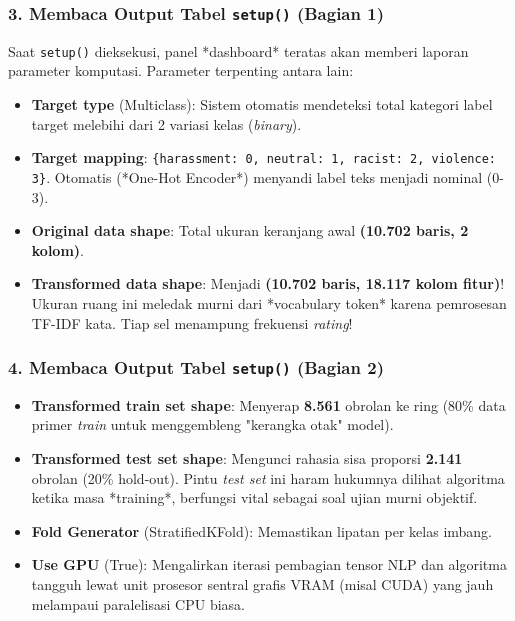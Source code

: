 \documentclass[t,aspectratio=169,xcolor=dvipsnames]{beamer}
\begin{document}
\begin{frame}
    \frametitle{3. Membaca Output Tabel \texttt{setup()} (Bagian 1)}
    \small
    Saat \texttt{setup()} dieksekusi, panel *dashboard* teratas akan memberi laporan parameter komputasi. Parameter terpenting antara lain:
    \vspace{0.2cm}
    \begin{itemize}
        \item \textbf{Target type} (Multiclass): Sistem otomatis mendeteksi total kategori label target melebihi dari 2 variasi kelas (\textit{binary}).
        \item \textbf{Target mapping}: \texttt{\{harassment: 0, neutral: 1, racist: 2, violence: 3\}}. Otomatis (*One-Hot Encoder*) menyandi label teks menjadi nominal (0-3).
        \item \textbf{Original data shape}: Total ukuran keranjang awal \textbf{(10.702 baris, 2 kolom)}.
        \item \textbf{Transformed data shape}: Menjadi \textbf{(10.702 baris, 18.117 kolom fitur)}! Ukuran ruang ini meledak murni dari *vocabulary token* karena pemrosesan TF-IDF kata. Tiap sel menampung frekuensi \textit{rating}!
    \end{itemize}
\end{frame}

\begin{frame}
    \frametitle{4. Membaca Output Tabel \texttt{setup()} (Bagian 2)}
    \small
    \begin{itemize}
        \item \textbf{Transformed train set shape}: Menyerap \textbf{8.561} obrolan ke ring (80\% data primer \textit{train} untuk menggembleng "kerangka otak" model).
        \item \textbf{Transformed test set shape}: Mengunci rahasia sisa proporsi \textbf{2.141} obrolan (20\% hold-out). Pintu \textit{test set} ini haram hukumnya dilihat algoritma ketika masa *training*, berfungsi vital sebagai soal ujian murni objektif.
        \item \textbf{Fold Generator} (StratifiedKFold): Memastikan lipatan per kelas imbang.
        \item \textbf{Use GPU} (True): Mengalirkan iterasi pembagian tensor NLP dan algoritma tangguh lewat unit prosesor sentral grafis VRAM (misal CUDA) yang jauh melampaui paralelisasi CPU biasa.
    \end{itemize}
\end{frame}
\end{document}
